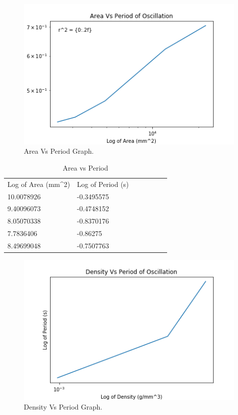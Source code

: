 \documentclass[12pt]{article}
\begin{document}
\begin{multicols}{2}

\begin{figure}[H]
\centering
\includegraphics[scale=0.6]{Media/Area_Vs_Period.png}
\caption{Area Vs Period Graph.}
\label{Area Vs Period Graph}
\end{figure}

\begin{table}[H]
\centering
\caption{Area vs Period}
\label{Area vs Period}
\begin{tabular}{lllllll}
Log of Area (mm\textasciicircum 2) & Log of Period (s) \\
10.0078926                      & -0.3495575                     \\
9.40096073                      & -0.4748152                     \\
8.05070338                       & -0.8370176                     \\
7.7836406                       & -0.86275                     \\
8.49699048                       & -0.7507763                    
\end{tabular}
\end{table}

\begin{figure}[H]
\centering
\includegraphics[scale=0.6]{Media/Density_Vs_Period.png}
\caption{Density Vs Period Graph.}
\label{Density Vs Period Graph}
\end{figure}


\end{multicols}
\end{document}
